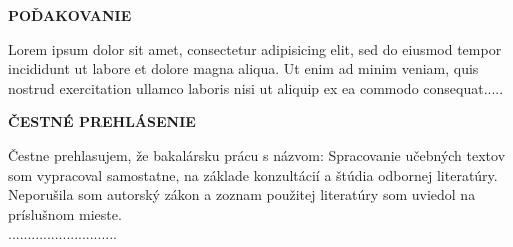 \newpage
\thispagestyle{plain}
\vspace*{15cm} 
\begin{large}
\noindent
\textbf{POĎAKOVANIE} \\
\end{large}
\noindent
Lorem ipsum dolor sit amet, consectetur adipisicing elit, sed do eiusmod tempor incididunt ut labore et dolore magna aliqua. Ut enim ad minim veniam, quis nostrud exercitation ullamco laboris nisi ut aliquip ex ea commodo consequat.....
\newpage
\thispagestyle{plain}
\vspace*{15cm} 
\begin{large}
\noindent
\textbf{ČESTNÉ PREHLÁSENIE} \\
\end{large}
\noindent
Čestne prehlasujem, že bakalársku prácu s názvom: Spracovanie učebných textov som vypracoval samostatne, na základe konzultácií a štúdia odbornej literatúry. Neporušila som autorský zákon a zoznam použitej literatúry som uviedol na príslušnom mieste.\vspace*{0.5cm}\\
\hspace*{10cm}............................\\
\hspace*{10.7cm} \Author